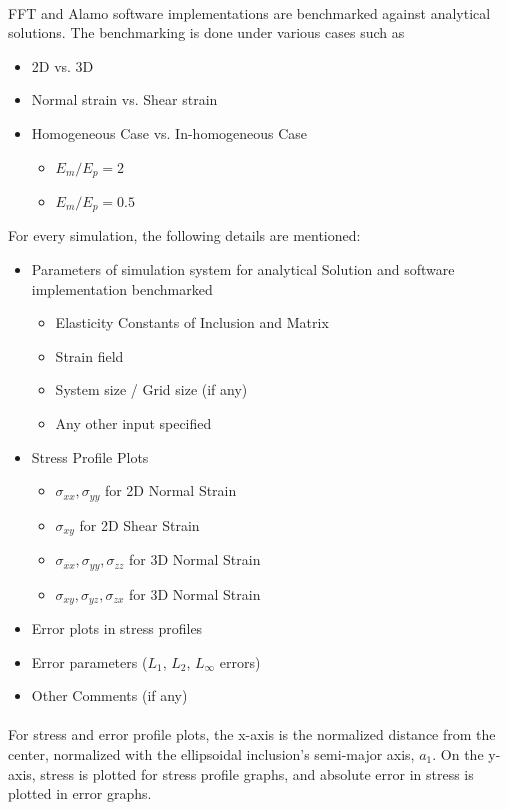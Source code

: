 \documentclass[12pt, a4paper]{report}
\begin{document}
\paragraph{}
FFT and Alamo software implementations are benchmarked against analytical solutions. The benchmarking is done under various cases such as
\begin{itemize}
    \item 2D vs. 3D
    \item Normal strain vs. Shear strain
    \item Homogeneous Case vs. In-homogeneous Case
    \begin{itemize}
        \item $E_m/E_p = 2$
        \item $E_m/E_p = 0.5$
    \end{itemize}
\end{itemize}
For every simulation, the following details are mentioned:
\begin{itemize}
    \item Parameters of simulation system for analytical Solution and software implementation benchmarked
    \begin{itemize}
        \item Elasticity Constants of Inclusion and Matrix
        \item Strain field
        \item System size / Grid size (if any)
        \item Any other input specified
    \end{itemize}
    \item Stress Profile Plots
    \begin{itemize}
        \item $\sigma_{xx}, \sigma_{yy}$ for 2D Normal Strain
        \item $\sigma_{xy}$ for 2D Shear Strain
        \item $\sigma_{xx}, \sigma_{yy}, \sigma_{zz}$ for 3D Normal Strain
        \item $\sigma_{xy}, \sigma_{yz}, \sigma_{zx}$ for 3D Normal Strain
    \end{itemize}
    \item Error plots in stress profiles
    \item Error parameters ($L_1$, $L_2$, $L_\infty$ errors)
    \item Other Comments (if any)
\end{itemize}

\paragraph{}
For stress and error profile plots, the x-axis is the normalized distance from the center, normalized with the ellipsoidal inclusion's semi-major axis, $a_1$. On the y-axis, stress is plotted for stress profile graphs, and absolute error in stress is plotted in error graphs. \\
\end{document}
